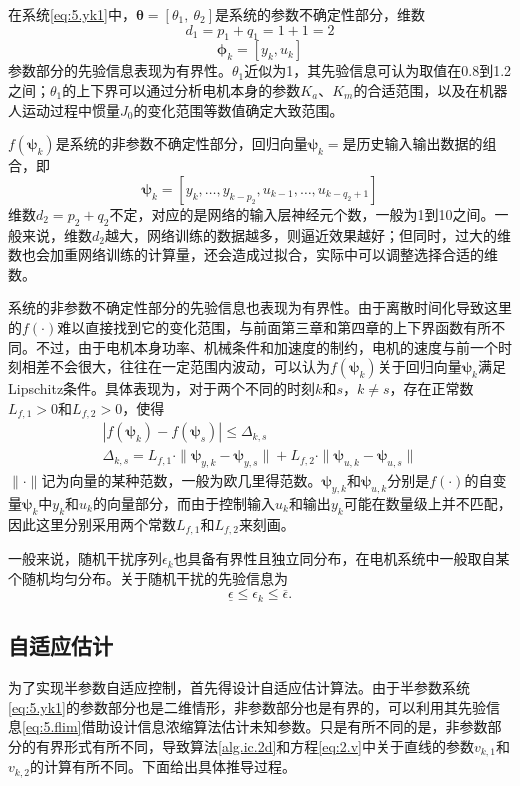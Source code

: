 在系统\eqref{eq:5.yk1}中，$\bm{\theta}=[\theta_{1},\ \theta_{2}]$是系统的参数不确定性部分，维数
$$d_{1}=p_{1}+q_{1}=1+1=2$$
$$\bm{\phi}_{k}=[y_{k},u_{k}]$$
参数部分的先验信息表现为有界性。$\theta_{1}$近似为1，其先验信息可认为取值在0.8到1.2之间；$\theta_{1}$的上下界可以通过分析电机本身的参数$K_{a}$、$K_{m}$的合适范围，以及在机器人运动过程中惯量$J_{0}$的变化范围等数值确定大致范围。

$f(\bm{\psi}_{k})$是系统的非参数不确定性部分，回归向量$\bm{\psi}_{k}=$是历史输入输出数据的组合，即
$$\bm{\psi}_{k}=[y_{k},\ldots,y_{k-p_{2}},u_{k-1},\dots,u_{k-q_{2}+1}]$$
维数$d_{2}=p_{2}+q_{2}$不定，对应的是网络的输入层神经元个数，一般为1到10之间。一般来说，维数$d_{2}$越大，网络训练的数据越多，则逼近效果越好；但同时，过大的维数也会加重网络训练的计算量，还会造成过拟合，实际中可以调整选择合适的维数。

系统的非参数不确定性部分的先验信息也表现为有界性。由于离散时间化导致这里的$f(\cdot)$难以直接找到它的变化范围，与前面第三章和第四章的上下界函数有所不同。不过，由于电机本身功率、机械条件和加速度的制约，电机的速度与前一个时刻相差不会很大，往往在一定范围内波动，可以认为$f(\bm{\psi}_{k})$关于回归向量$\bm{\psi}_{k}$满足Lipschitz条件。具体表现为，对于两个不同的时刻$k$和$s$，$k\neq s$，存在正常数$L_{f,1}>0$和$L_{f,2}>0$，使得
\begin{equation}\label{eq:5.flim}
\begin{array}{c}
|f(\bm{\psi}_{k})-f(\bm{\psi}_{s})|\leq \Delta_{k,s}\\
\Delta_{k,s}=L_{f,1}\cdot\|\bm{\psi}_{y,k}-\bm{\psi}_{y,s}\|+L_{f,2}\cdot\|\bm{\psi}_{u,k}-\bm{\psi}_{u,s}\|
\end{array}
\end{equation}
$\|\cdot\|$记为向量的某种范数，一般为欧几里得范数。$\bm{\psi}_{y,k}$和$\bm{\psi}_{u,k}$分别是$f(\cdot)$的自变量$\bm{\psi}_{k}$中$y_{k}$和$u_{k}$的向量部分，而由于控制输入$u_{k}$和输出$y_{k}$可能在数量级上并不匹配，因此这里分别采用两个常数$L_{f,1}$和$L_{f,2}$来刻画。

一般来说，随机干扰序列$\epsilon_{k}$也具备有界性且独立同分布，在电机系统中一般取自某个随机均匀分布。关于随机干扰的先验信息为
$$\underline{\epsilon}\leq\epsilon_{k}\leq\overline{\epsilon}.$$

\subsection{自适应估计}\label{5.2.2}
为了实现半参数自适应控制，首先得设计自适应估计算法。由于半参数系统\eqref{eq:5.yk1}的参数部分也是二维情形，非参数部分也是有界的，可以利用其先验信息\eqref{eq:5.flim}借助设计信息浓缩算法估计未知参数。只是有所不同的是，非参数部分的有界形式有所不同，导致算法\ref{alg.ic.2d}和方程\eqref{eq:2.v}中关于直线的参数$v_{k,1}$和$v_{k,2}$的计算有所不同。下面给出具体推导过程。


